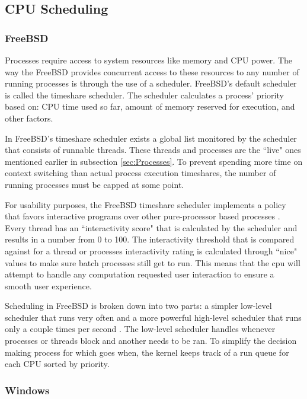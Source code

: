 \subsection{CPU Scheduling}
\label{sec:CPU Scheduling}

\subsubsection{FreeBSD}
\label{sub:CPU Scheduling FreeBSD}

\par Processes require access to system resources like memory and CPU power.
The way the FreeBSD provides concurrent access to these resources to any number of running processes is through the use of a scheduler.
FreeBSD's default scheduler is called the timeshare scheduler.
The scheduler calculates a process' priority based on: CPU time used so far, amount of memory reserved for execution, and other factors.
\par In FreeBSD's timeshare scheduler exists a global list monitored by the scheduler that consists of runnable threads.
These threads and processes are the ``live" ones mentioned earlier in subsection \ref{sec:Processes}.
To prevent spending more time on context switching than actual process execution timeshares, the number of running processes must be capped at some point.
\par For usability purposes, the FreeBSD timeshare scheduler implements a policy that favors interactive programs over other pure-processor based processes \cite{bsd:1}.
Every thread has an ``interactivity score" that is calculated by the scheduler and results in a number from 0 to 100.
The interactivity threshold that is compared against for a thread or processes interactivity rating is calculated through ``nice" values to make sure batch processes still get to run.
This means that the cpu will attempt to handle any computation requested user interaction to ensure a smooth user experience.
\par Scheduling in FreeBSD is broken down into two parts: a simpler low-level scheduler that runs very often and a more powerful high-level scheduler that runs only a couple times per second \cite{bsd:1}.
The low-level scheduler handles whenever processes or threads block and another needs to be ran.
To simplify the decision making process for which goes when, the kernel keeps track of a run queue for each CPU sorted by priority.

\subsubsection{Windows}
\label{sub:CPU Scheduling Windows}

